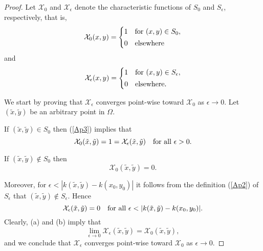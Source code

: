 \documentclass{imanum}
\begin{document}
\begin{proof}
Let $\mathcal{X}_0$ and $\mathcal{X}_\epsilon$ denote the
characteristic functions of $S_0$ and $S_\epsilon$, respectively,
that is,
\begin{equation*}
\mathcal{X}_0 (x,y) =
\begin{cases}
1 & \hbox{for } (x,y) \in S_0, \\[2pt]
0 & \hbox{elsewhere}
\end{cases}
\end{equation*}
and
\begin{equation*}
\mathcal{X}_\epsilon (x,y) =
\begin{cases}
1 & \hbox{for } (x,y) \in S_\epsilon, \\[2pt]
0 & \hbox{elsewhere}.
\end{cases}
\end{equation*}

We start by proving that $\mathcal{X}_\epsilon$ converges point-wise
toward $\mathcal{X}_0$ as $\epsilon \rightarrow 0$. Let
$(\tilde x, \tilde y)$ be an arbitrary point in $\Omega$.
\begin{NumberedListAlpha}
\item
If $(\tilde x, \tilde y) \in S_0$ then (\ref{Ap3}) implies that
\begin{equation*}
\mathcal{X}_0 (\tilde x, \tilde y) = 1 =
\mathcal{X}_\epsilon (\tilde x, \tilde y)
\quad \hbox{for all}\ \epsilon > 0.
\end{equation*}

\item
If $(\tilde x, \tilde y) \notin S_0$ then
\begin{equation*}
\mathcal{X}_0 (\tilde x, \tilde y) = 0.
\end{equation*}
\end{NumberedListAlpha}
Moreover, for $\epsilon < |k(\tilde x, \tilde y) - k(x_0,y_0)|$
it follows from the definition (\ref{Ap2}) of $S_\epsilon$
that $(\tilde x, \tilde y) \notin S_\epsilon$. Hence
\begin{equation*}
\mathcal{X}_\epsilon (\tilde x, \tilde y) = 0
\quad \hbox{for all}\ \epsilon
< |k(\tilde x, \tilde y) - k(x_0,y_0)|.
\end{equation*}
Clearly, (a) and (b) imply that
\begin{equation*}
\lim_{\epsilon \rightarrow 0} \mathcal{X}_\epsilon
(\tilde x, \tilde y)
= \mathcal{X}_0 (\tilde x, \tilde y) ,
\end{equation*}
and we conclude that $\mathcal{X}_\epsilon$ converges point-wise
toward $\mathcal{X}_0$ as $\epsilon \rightarrow 0$.


\end{proof}
\end{document}
